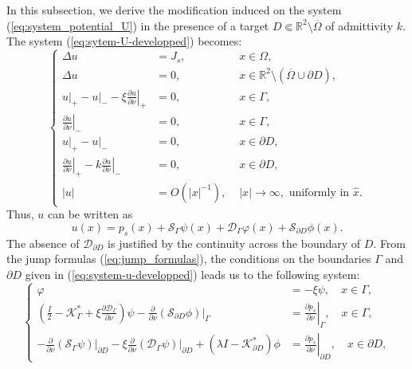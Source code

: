 In this subsection, we derive the modification induced on the
system (\ref{eq:system_potential_U}) in the presence of a target
$D \Subset \mathbb{R}^{2}\setminus \overline{\Omega}$ of 
admittivity $k$. The system (\ref{eq:sytem-U-developped})
becomes:
\begin{equation}
\left\{ \begin{alignedat}{2}\Delta u & ={J_s}, & \,\, x\in\Omega,\\
\Delta u & =0, & \,\, x\in\mathbb{R}^{2}\setminus\left(\overline{\Omega}\cup\partial D\right),\\
u\big|_+ - u \big|_- -\xi\left.\frac{\partial u}{\partial\nu}\right|_{+} & =0, & \,\, x\in\Gamma,\\
\left.\frac{\partial u}{\partial\nu}\right|_{-} & =0, & \,\, x\in\Gamma,\\
{}u\big|_+ - u \big|_-  & =0, & \,\, x\in \partial D,\\
\left.\frac{\partial
u}{\partial\nu}\right|_{+}-k\left.\frac{\partial
u}{\partial\nu}\right|_{-} & =0, & \,\, x\in \partial
D,\\
\left|u\right| & = {O}(\left|x\right|^{-1}), &
\,\,\left|x\right|\rightarrow\infty,\text{ uniformly in }\hat{x}.
\end{alignedat}
\right.\label{eq:system-u-developped}
\end{equation}
Thus, $u$ can be written as
\begin{equation}
u(x)=p_s(x)+\mathcal{S}_{\Gamma}\psi(x)+\mathcal{D}_{\Gamma}\varphi(x)+\mathcal{S}_{\partial
D}\phi(x).
\label{eq:potential-with-target}
\end{equation}
The absence of $\mathcal{D}_{\partial D}$ is justified by the
continuity across the boundary of $D$. From the jump formulas
(\ref{eq:jump_formulas}), the conditions on the boundaries
$\Gamma$ and $\partial D$ given in (\ref{eq:system-u-developped})
leads us to the following system:
\begin{equation}
\left\{ \begin{alignedat}{1}\varphi & =-\xi\psi, \quad x \in \Gamma, \\
\left(\frac{I}{2}-\mathcal{K}_{\Gamma}^{*}+\xi\frac{\partial\mathcal{D}_{\Gamma}}{\partial\nu}\right)\psi
-\frac{\partial}{\partial\nu}\left.\left(\mathcal{S}_{\partial
D}\phi\right)\right|_{\Gamma} &
=\left.\frac{\partial p_s}{\partial\nu}\right|_{\Gamma}, \quad x \in \Gamma, \\
-\frac{\partial}{\partial\nu}\left.\left(\mathcal{S}_{\Gamma}\psi\right)\right|_{\partial
D}-\xi\frac{\partial}{\partial\nu}\left.\left(\mathcal{D}_{\Gamma}\psi\right)\right|_{\partial
D}+\left(\lambda I-\mathcal{K}_{\partial D}^{*}\right)\phi &
=\left.\frac{\partial p_s}{\partial\nu}\right|_{\partial D}, \quad x
\in \partial D,
\end{alignedat}
\right.\label{eq:system-potentials-anomaly}
\end{equation}
